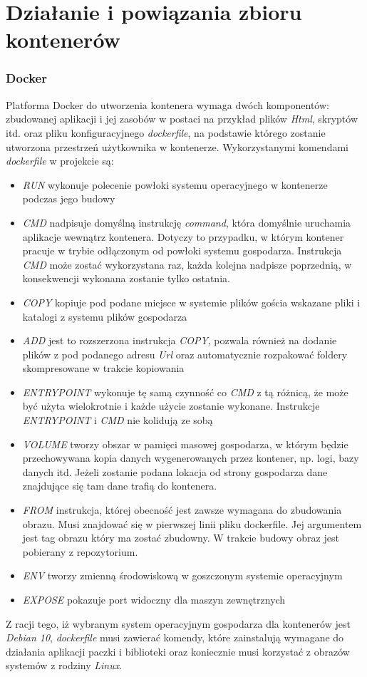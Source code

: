 \documentclass[polish, a4paper, 12pt, oneside]{book}
\begin{document}
	\section{Działanie i powiązania zbioru kontenerów}
	\subsubsection{Docker}
	Platforma Docker do utworzenia kontenera wymaga dwóch komponentów: zbudowanej aplikacji i jej zasobów w postaci na przykład plików \textit{Html}, skryptów itd. oraz pliku konfiguracyjnego \textit{dockerfile}, na podstawie którego zostanie utworzona przestrzeń użytkownika w kontenerze. Wykorzystanymi komendami \textit{dockerfile} w projekcie są:
	\begin{itemize}[noitemsep]
		\item \textit{RUN} wykonuje polecenie powłoki systemu operacyjnego w kontenerze podczas jego budowy
		\item \textit{CMD} nadpisuje domyślną instrukcję \textit{command}, która domyślnie uruchamia aplikacje wewnątrz kontenera. Dotyczy to przypadku, w którym kontener pracuje w trybie odłączonym od powłoki systemu gospodarza. Instrukcja \textit{CMD} może zostać wykorzystana raz, każda kolejna nadpisze poprzednią, w konsekwencji wykonana zostanie tylko ostatnia.
		\item \textit{COPY} kopiuje pod podane miejsce w systemie plików gościa wskazane pliki i katalogi z systemu plików gospodarza
		\item \textit{ADD} jest to rozszerzona instrukcja \textit{COPY}, pozwala również na dodanie plików z pod podanego adresu \textit{Url} oraz automatycznie rozpakować foldery skompresowane w trakcie kopiowania
		\item \textit{ENTRYPOINT} wykonuje tę samą czynność co \textit{CMD} z tą różnicą, że może być użyta wielokrotnie i każde użycie zostanie wykonane. Instrukcje \textit{ENTRYPOINT} i \textit{CMD} nie kolidują ze sobą
		\item \textit{VOLUME} tworzy obszar w pamięci masowej gospodarza, w którym będzie przechowywana kopia danych wygenerowanych przez kontener, np. logi, bazy danych itd. Jeżeli zostanie podana lokacja od strony gospodarza dane znajdujące się tam dane trafią do kontenera.
		\item \textit{FROM} instrukcja, której obecność jest zawsze wymagana do zbudowania obrazu. Musi znajdować się w pierwszej linii pliku dockerfile. Jej argumentem jest tag obrazu który ma zostać zbudowny. W trakcie budowy obraz jest pobierany z repozytorium.
		\item \textit{ENV} tworzy zmienną środowiskową w goszczonym systemie operacyjnym
		\item \textit{EXPOSE} pokazuje port widoczny dla maszyn zewnętrznych
	\end{itemize}
	Z racji tego, iż wybranym system operacyjnym gospodarza dla kontenerów jest \textit{Debian 10}\cite{debian10}, \textit{dockerfile} musi zawierać komendy, które zainstalują wymagane do działania aplikacji paczki i biblioteki oraz koniecznie musi korzystać z obrazów systemów z rodziny \textit{Linux}.
\end{document}
